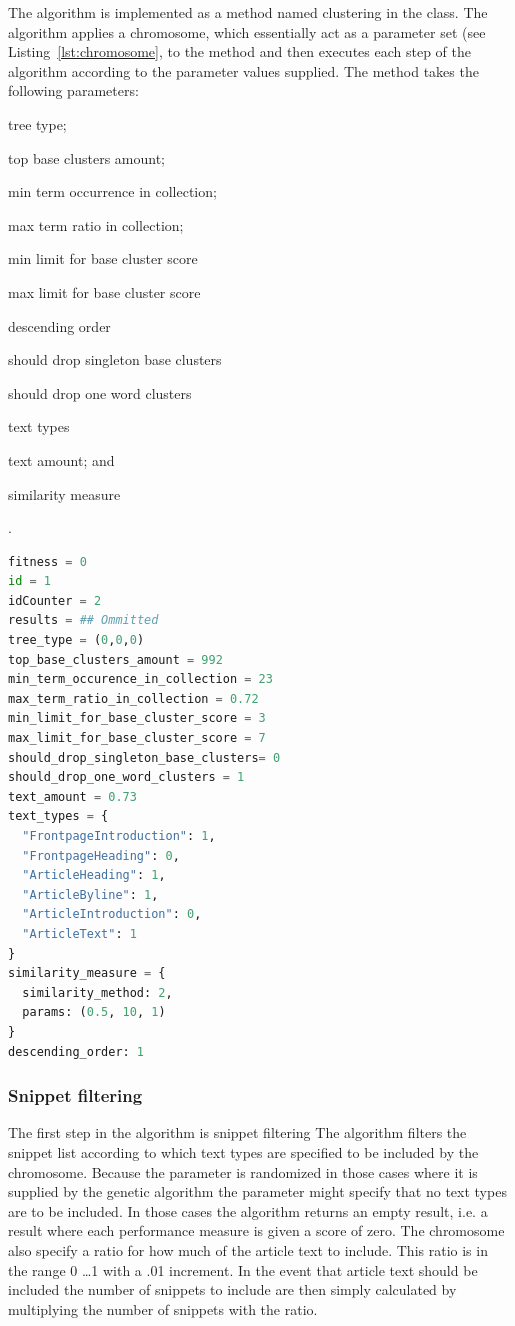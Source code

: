 The \CTC algorithm is implemented as a method named clustering in the \CTC class. The algorithm applies a chromosome, which essentially act as a parameter set (see Listing~\ref{lst:chromosome}, to the method and then executes each step of the \CTC algorithm according to the parameter values supplied. The method takes the following parameters:
\begin{inparaenum}[\itshape 1\upshape)]
\item tree type;
\item top base clusters amount;
\item min term occurrence in collection;
\item max term ratio in collection;
\item min limit for base cluster score
\item max limit for base cluster score
\item descending order
\item should drop singleton base clusters
\item should drop one word clusters
\item text types
\item text amount; and
\item similarity measure
\end{inparaenum}.

\begin{lstlisting}[float=t, language=python, label=lst:chromosome, caption={An example chromosome}]
fitness = 0
id = 1
idCounter = 2
results = ## Ommitted
tree_type = (0,0,0)
top_base_clusters_amount = 992
min_term_occurence_in_collection = 23
max_term_ratio_in_collection = 0.72
min_limit_for_base_cluster_score = 3
max_limit_for_base_cluster_score = 7
should_drop_singleton_base_clusters= 0
should_drop_one_word_clusters = 1
text_amount = 0.73
text_types = {
  "FrontpageIntroduction": 1,
  "FrontpageHeading": 0,
  "ArticleHeading": 1,
  "ArticleByline": 1,
  "ArticleIntroduction": 0,
  "ArticleText": 1
}
similarity_measure = {
  similarity_method: 2,
  params: (0.5, 10, 1)
}
descending_order: 1
\end{lstlisting}

\subsubsection{Snippet filtering}
The first step in the \CTC algorithm is snippet filtering The algorithm filters the snippet list according to which text types are specified to be included by the chromosome. Because the parameter is randomized in those cases where it is supplied by the genetic algorithm the parameter might specify that no text types are to be included. In those cases the algorithm returns an empty result, i.e. a result where each performance measure is given a score of zero. The chromosome also specify a ratio for how much of the article text to include. This ratio is in the range 0 \dots 1 with a .01 increment. In the event that article text should be included the number of snippets to include are then simply calculated by multiplying the number of snippets with the ratio.

